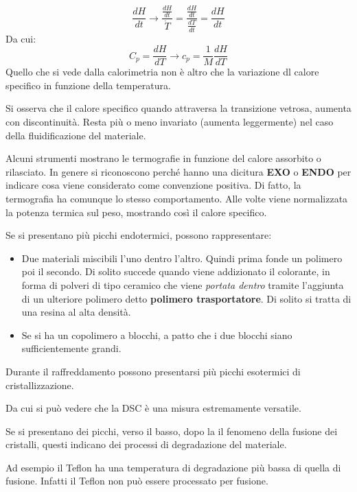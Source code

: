\begin{equation}
\frac{dH}{dt} \rightarrow \frac{\frac{dH}{dt}}{\dot{T}} = \frac{\frac{dH}{dt}}{\frac{dT}{dt}} = \frac{dH}{dt}
\end{equation}
Da cui:
\begin{equation}
C_p = \frac{dH}{dT} \rightarrow c_p = \frac{1}{M}\frac{dH}{dT}
\end{equation}
Quello che si vede dalla calorimetria non è altro che la variazione dl calore specifico in funzione della temperatura.

Si osserva che il calore specifico quando attraversa la transizione vetrosa, aumenta con discontinuità. Resta più o meno invariato (aumenta leggermente) nel caso della fluidificazione del materiale.

Alcuni strumenti mostrano le termografie in funzione del calore assorbito o rilasciato. In genere si riconoscono perché hanno una dicitura \textbf{EXO} o \textbf{ENDO} per indicare cosa viene considerato come convenzione positiva.
Di fatto, la termografia ha comunque lo stesso comportamento.
Alle volte viene normalizzata la potenza termica sul peso, mostrando così il calore specifico.

Se si presentano più picchi endotermici, possono rappresentare:
\begin{itemize}
\item Due materiali miscibili l'uno dentro l'altro. Quindi prima fonde un polimero poi il secondo. Di solito succede quando viene addizionato il colorante, in forma di polveri di tipo ceramico che viene \textit{portata dentro} tramite l'aggiunta di un ulteriore polimero detto \textbf{polimero trasportatore}. Di solito si tratta di una resina al alta densità.
\item Se si ha un copolimero a blocchi, a patto che i due blocchi siano sufficientemente grandi.
\end{itemize}

Durante il raffreddamento possono presentarsi più picchi esotermici di cristallizzazione.

Da cui si può vedere che la \ac{DSC} è una misura estremamente versatile.

Se si presentano dei picchi, verso il basso, dopo la il fenomeno della fusione dei cristalli, questi indicano dei processi di degradazione del materiale.

Ad esempio il Teflon ha una temperatura di degradazione più bassa di quella di fusione. Infatti il Teflon non può essere processato per fusione.


